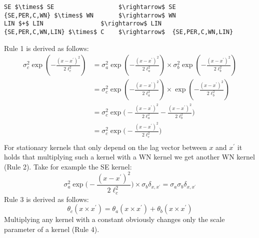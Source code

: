 \begin{minipage}{\linewidth}
\small
\belowcaptionskip=-10pt
\begin{lstlisting}[frame=single,mathescape,label=alg:simplify,basicstyle=\selectfont\ttfamily]
SE $\times$ SE                  $\rightarrow$ SE 
{SE,PER,C,WN} $\times$ WN       $\rightarrow$ WN
LIN $+$ LIN                $\rightarrow$ LIN
{SE,PER,C,WN,LIN} $\times$ C    $\rightarrow$  {SE,PER,C,WN,LIN} 
\end{lstlisting}
\end{minipage}
Rule 1 is derived as follows:
\begin{equation}
\begin{aligned}
\sigma_c^2 \exp(-\frac{(x-x^\prime)^2}{2\ell_c^2})  &=  \sigma_a^2 \exp(-\frac{(x-x^\prime)^2}{2\ell_a^2}) \times  \sigma_b^2 \exp(-\frac{(x-x^\prime)^2}{2\ell_b^2}) \\
&= \sigma_c^2 \exp(-\frac{(x-x^\prime)^2}{2\ell_a^2}) \times   \exp(-\frac{(x-x^\prime)^2}{2\ell_b^2}) \\
&= \sigma_c^2 \exp \bigg(-\frac{(x-x^\prime)^2}{2\ell_a^2} -\frac{(x-x^\prime)^2}{2\ell_b^2}\bigg) \\
&= \sigma_c^2 \exp \bigg(-\frac{(x-x^\prime)^2}{2\ell_c^2}\bigg) \\
\end{aligned}
\end{equation}
For stationary kernels that only depend on the lag vector between $x$ and $x^\prime$ it holds that multiplying such a kernel with a WN kernel we get another WN kernel (Rule 2). Take for example the SE kernel:
\begin{equation}
 \sigma_a^2 \exp \bigg(-\frac{(x-x^\prime)^2}{2\ell_c^2}\bigg) \times  \sigma_b \delta_{x,x^\prime} =  \sigma_a \sigma_b \delta_{x,x^\prime}
\end{equation}
Rule 3 is derived as follows:
\begin{equation}
 \theta_c (x \times x^\prime) = \theta_a (x \times x^\prime) + \theta_b (x \times x^\prime) 
\end{equation}
Multiplying any kernel with a constant obviously changes only the scale parameter of a kernel (Rule 4).
